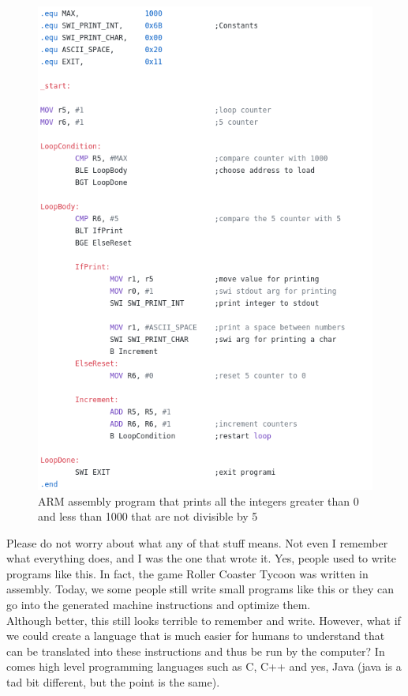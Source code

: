 \documentclass[11]{article}
\begin{document}
\begin{figure}[H]
	\centering
	\includegraphics[scale=0.5]{arm.png}
	\caption{ARM assembly program that prints all the integers greater than 0 and less than 1000 that are not divisible by 5}
\end{figure}



Please do not worry about what any of that stuff means. Not even I remember what everything does, and I was the one that wrote it. Yes, people used to write programs like this. In fact, the game Roller Coaster Tycoon was written in assembly. Today, we some people still write small programs like this or they can go into the generated machine instructions and optimize them.\\

Although better, this still looks terrible to remember and write. However, what if we could create a language that is much easier for humans to understand that can be translated into these instructions and thus be run by the computer? In comes high level programming languages such as C, C++ and yes, Java (java is a tad bit different, but the point is the same).\\
\end{document}
